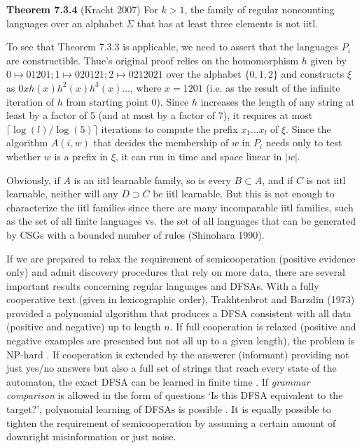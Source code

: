 \smallskip\noindent 
{\bf Theorem 7.3.4} (Kracht 2007) For $k>1$, the family of regular noncounting
languages over an alphabet $\Sigma$ that has at least three elements is not
iitl.\nocite{Kracht:2007}

\smallskip{} To see that Theorem 7.3.3 is applicable,
we need to assert that the languages $P_i$ are constructible. Thue's original
proof relies on the homomorphism $h$ given by $0 \mapsto 01201; 1 \mapsto
020121; 2 \mapsto 0212021$ over the alphabet $\{0,1,2\}$ and constructs $\xi$
as $0xh(x)h^2(x)h^3(x)\ldots$, where $x=1201$ (i.e. as the result of the
infinite iteration of $h$ from starting point $0$). Since $h$ increases the
length of any string at least by a factor of 5 (and at most by a factor of 7),
it requires at most $\lceil \log(l)/\log(5) \rceil$ iterations to compute the
prefix $x_1\ldots x_l$ of $\xi$.  Since the algorithm $A(i,w)$ that decides
the membership of $w$ in $P_i$ needs only to test whether $w$ is a prefix in
$\xi$, it can run in time and space linear in $|w|$.

Obviously, if $A$ is an iitl learnable family, so is every $B\subset A$, and if
$C$ is not iitl learnable, neither will any $D \supset C$ be iitl
learnable. But this is not enough to characterize the iitl families since
there are many incomparable iitl families, such as the set of all finite
languages vs. the set of all languages that can be generated by CSGs with a
bounded number of rules (Shinohara 1990).  \nocite{Shinohara:1990}

If we are prepared to relax the requirement of semicooperation (positive
evidence only) and admit discovery procedures that rely on more data, there
are several important results concerning regular languages and DFSAs. With a
fully cooperative text (given in lexicographic order), Trakhtenbrot and Barzdin
(1973)\nocite{Trakhtenbrot:1973} provided a polynomial algorithm that produces
a DFSA consistent with all data (positive and negative) up to length $n$. If
full cooperation is relaxed (positive and negative examples are presented but
not all up to a given length), the problem is NP-hard \cite{Gold:1978}. If
cooperation is extended by the answerer (informant) providing not just yes/no
answers but also a full set of strings that reach every state of the
automaton, the exact DFSA can be learned in finite time \cite{Angluin:1981}.
If {\it grammar comparison} is allowed in the form of questions `Is this DFSA
equivalent to the target?', polynomial learning of DFSAs is possible
\cite{Angluin:1987}. It is equally possible to tighten the requirement of
semicooperation by assuming a certain amount of downright misinformation or
just noise. 

